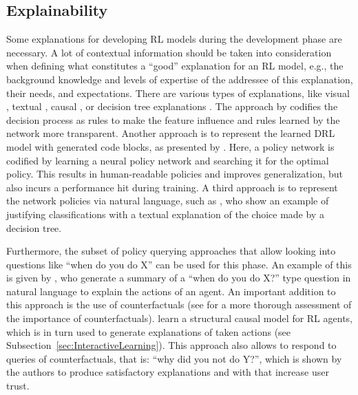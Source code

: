 \documentclass[twoside,11pt]{article}
\begin{document}
\begin{enumerate}
\subsection{Explainability}
Some explanations for developing RL models during the development phase are necessary. A lot of contextual information should be taken into consideration when defining what constitutes a ``good” explanation for an RL model, e.g., the background knowledge and levels of expertise of the addressee of this explanation, their needs, and expectations. There are various types of explanations, like visual \citep{DBLP:journals/corr/abs-1912-12191,DBLP:journals/corr/abs-1912-05743}, textual \citep{fukuchi2017autonomous,HayesShah:2017:AutonomousPolicyExplanation}, causal \citep{MadumalEtAl:2020:CausalRLCFs,Madumal:2020:DistalEF}, or decision tree explanations \citep{bastani2018verifiable}. The approach by \citet{LiuEtAl:2018:LinearModelUTrees} codifies the decision process as rules to make the feature influence and rules learned by the network more transparent. Another approach is to represent the learned DRL model with generated code blocks, as presented by \citet{VermaEtAl:2018:ProgrammaticallyInterpretableRL}. Here, a policy network is codified by learning a neural policy network and searching it for the optimal policy. This results in human-readable policies and improves generalization, but also incurs a performance hit during training. A third approach is to represent the network policies via natural language, such as \citet{AlonsoEtAl:2018:xAINLBeerClassifier}, who show an example of justifying classifications with a textual explanation of the choice made by a decision tree.

Furthermore, the subset of policy querying approaches that allow looking into questions like ``when do you do X'' can be used for this phase.
An example of this is given by \citet{HayesShah:2017:AutonomousPolicyExplanation}, who generate a summary of a ``when do you do X?'' type question in natural language to explain the actions of an agent. An important addition to this approach is the use of counterfactuals (see \citet{EvansEtAl:2021:ExplainabilityParadox} for a more thorough assessment of the importance of counterfactuals). \citet{MadumalEtAl:2020:CausalRLCFs} learn a structural causal model for RL agents, which is in turn used to generate explanations of taken actions (see Subsection~\ref{sec:InteractiveLearning}). This approach also allows to respond to queries of counterfactuals, that is: ``why did you not do Y?'', which is shown by the authors to produce satisfactory explanations and with that increase user trust.


\end{enumerate}
\end{document}
